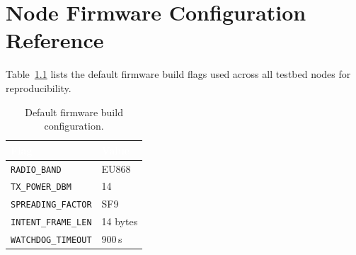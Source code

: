 \chapter{Node Firmware Configuration Reference}
\label{app:firmware}

Table~\ref{tab:firmware} lists the default firmware build flags used across all testbed
nodes for reproducibility.

\begin{table}[H]
\centering
\caption{Default firmware build configuration.}
\label{tab:firmware}
\begin{tabularx}{\textwidth}{@{}lX@{}}
\toprule
\rowcolor{nustgreen}
\textcolor{white}{\bfseries Flag} & \textcolor{white}{\bfseries Value} \\
\midrule
\texttt{RADIO\_BAND}        & EU868 \\
\rowcolor{nustmist}
\texttt{TX\_POWER\_DBM}     & 14 \\
\texttt{SPREADING\_FACTOR}  & SF9 \\
\rowcolor{nustmist}
\texttt{INTENT\_FRAME\_LEN} & 14 bytes \\
\texttt{WATCHDOG\_TIMEOUT}  & 900\,s \\
\bottomrule
\end{tabularx}
\end{table}

